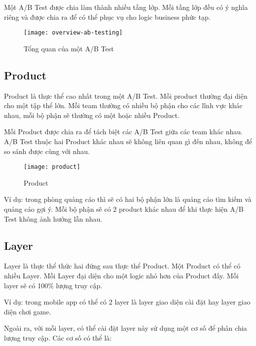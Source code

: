 Một A/B Test được chia làm thành nhiều tầng lớp.  Mỗi tầng lớp đều có ý nghĩa riêng và được chia ra để có thể phục vụ cho logic business phức tạp.

\begin{figure}[ht]
	\centering
	\texttt{[image: overview-ab-testing]}
	\caption{Tổng quan của một A/B Test}
\end{figure}

\subsection{Product}

Product là thực thể cao nhất trong một A/B Test. Mỗi product thường đại diện cho một tập thể lớn. Mỗi team thường có nhiều bộ phận cho các lĩnh vực khác nhau, mỗi bộ phận sẽ thường có một hoặc nhiều Product.

Mỗi Product được chia ra để tách biệt các A/B Test giữa các team khác nhau. A/B Test thuộc hai Product khác nhau sẽ không liên quan gì đến nhau, không để so sánh được cùng với nhau.

\begin{figure}[ht]
	\centering
	\texttt{[image: product]}
	\caption{Product}
\end{figure}

Ví dụ: trong phòng quảng cáo thì sẽ có hai bộ phận lớn là quảng cáo tìm kiếm và quảng cáo gợi ý. Mỗi bộ phận sẽ có 2 product khác nhau để khi thực hiện A/B Test không ảnh hưởng lẫn nhau.

\subsection{Layer}

Layer là thực thể thức hai đứng sau thực thể Product. Một Product có thể có nhiều Layer. Mỗi Layer đại diện cho một logic nhỏ hơn của Product đấy. Mỗi layer sẽ có 100\% lượng truy cập.

Ví dụ: trong mobile app có thể có 2 layer là layer giao diện cài đặt hay layer giao diện chơi game.

Ngoài ra, với mỗi layer, có thể cài đặt layer này sử dụng một cơ số để phân chia lượng truy cập. Các cơ số có thể là:

\begin{itemize}
\end{itemize}

